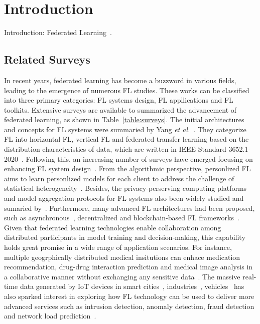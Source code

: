 \section{Introduction}
Introduction:
Federated Learning~\cite{li2020federated}.

\subsection{Related Surveys}
In recent years, federated learning has become a buzzword in various fields, leading to the emergence of numerous FL studies.
These works can be classified into three primary categories: FL systems design, FL appllications and FL toolkits. Extensive surveys are available to summarized the advancement of federated learning, as shown in Table~\ref{table:surveys}.
The initial architectures and concepts for FL systems were summaried by Yang \textit{et al.}~\cite{yang2019federated}. 
They categorize FL into horizontal FL, vertical FL and federated transfer learning based on the distribution characteristics of data, 
which are written in IEEE Standard 3652.1-2020~\cite{yang2021white, IEEEstd3652}. 
Following this, an increasing number of surveys have emerged focusing on enhancing FL system design~\cite{li2020federated,aledhari2020federated, kairouz2021advances, zhang2021survey, li2021survey}. 
From the algorithmic perspective, personlized FL~\cite{kulkarni2020survey, tan2022towards} aims to learn personlized models for each client to address the challenge of statistical heterogeneity~\cite{ma2022state}.
Besides, the privacy-perserving computing platforms and model aggregation protocols for FL systems also been widely studied and sumaried by~\cite{liu2022privacy,el2022differential,yin2021comprehensive,lyu2020threats}.
Furthermore, many advanced FL architectures had been proposed, such as asynchronous~\cite{xu2021asynchronous}, decentralized and blockchain-based FL frameworks~\cite{nguyen2021federated, qu2022blockchain, zhu2022blockchain}.
Given that federated learning technologies enable collaboration among distributed participants in model training and decision-making, this capability holds great promise in a wide range of application scenarios.
For instance, multiple geogrphically distributed medical insitutions can enhace medication recommendation, drug-drug interaction prediction and medical image analysis in a collaborative manner without exchanging any sensitive data~\cite{xu2021federated, pfitzner2021federated, antunes2022federated, rieke2020future}. 
The massive real-time data generated by IoT devices in smart cities~\cite{zhang2022federated, ramu2022federated}, industries~\cite{boopalan2022fusion}, vehicles~\cite{du2020federated} has also sparked interest in exploring how FL technology can be used to deliver more advanced services such as intrusion detection, anomaly detection, fraud detection and network load prediction~\cite{agrawal2022federated, alazab2021federated, ghimire2022recent}.

